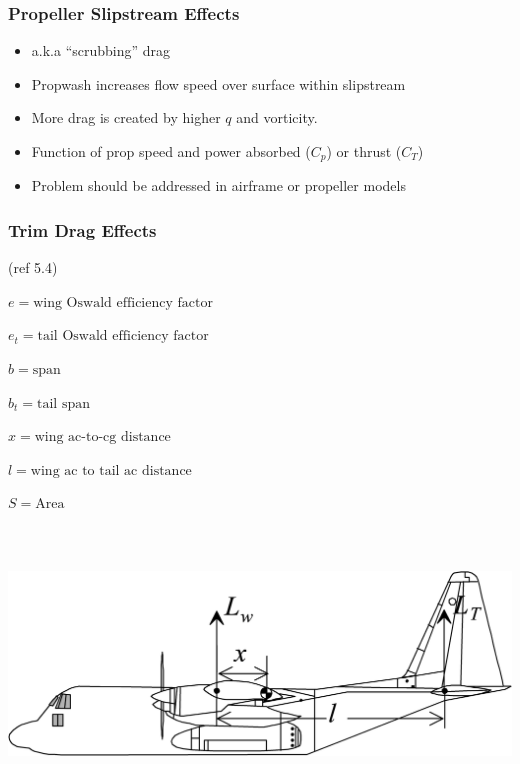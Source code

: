 \documentclass[
]{book}
\providecommand{\tightlist}{%
  \setlength{\itemsep}{0pt}\setlength{\parskip}{0pt}}
\begin{document}
\hypertarget{propeller-slipstream-effects}{%
\subsubsection*{Propeller Slipstream Effects}\label{propeller-slipstream-effects}}

\begin{itemize}
\tightlist
\item
  a.k.a ``scrubbing'' drag
\item
  Propwash increases flow speed over surface within slipstream
\item
  More drag is created by higher \(q\) and vorticity.
\item
  Function of prop speed and power absorbed (\(C_p\)) or thrust (\(C_T\))
\item
  Problem should be addressed in airframe or propeller models
\end{itemize}

\hypertarget{trim-drag-effects}{%
\subsubsection*{Trim Drag Effects}\label{trim-drag-effects}}

(ref 5.4)

\(e = \text{wing Oswald efficiency factor}\)

\(e_t = \text{tail Oswald efficiency factor}\)

\(b = \text{span}\)

\(b_t = \text{tail span}\)

\(x = \text{wing ac-to-cg distance}\)

\(l = \text{wing ac to tail ac distance}\)

\(S = \text{Area}\)

\includegraphics[width=7.75in,height=2.844in]{media/05/image86.svg}
\end{document}
